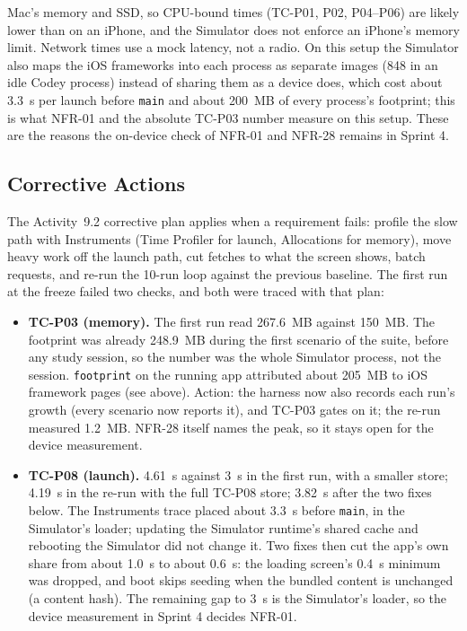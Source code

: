 \documentclass[12pt,letterpaper]{article}
\begin{document}
\begin{itemize}
        Mac's memory and SSD, so CPU-bound times (TC-P01, P02, P04--P06) are likely
        lower than on an iPhone, and the Simulator does not enforce an iPhone's memory
        limit. Network times use a mock latency, not a radio. On this setup the
        Simulator also maps the iOS frameworks into each process as separate images
        (848 in an idle Codey process) instead of sharing them as a device does,
        which cost about 3.3~s per launch before \texttt{main} and about 200~MB of
        every process's footprint; this is what NFR-01 and the absolute TC-P03
        number measure on this setup. These are the reasons the on-device check of
        NFR-01 and NFR-28 remains in Sprint 4.
\end{itemize}

\subsection{Corrective Actions}
The Activity~9.2 corrective plan applies when a requirement fails: profile the slow
path with Instruments (Time Profiler for launch, Allocations for memory), move heavy
work off the launch path, cut fetches to what the screen shows, batch requests, and
re-run the 10-run loop against the previous baseline. The first run at the freeze
failed two checks, and both were traced with that plan:
\begin{itemize}
  \item \textbf{TC-P03 (memory).} The first run read 267.6~MB against 150~MB. The
        footprint was already 248.9~MB during the first scenario of the suite, before
        any study session, so the number was the whole Simulator process, not the
        session. \texttt{footprint} on the running app attributed about 205~MB to iOS
        framework pages (see above). Action: the harness now also records each run's
        growth (every scenario now reports it), and TC-P03 gates on it; the re-run
        measured 1.2~MB. NFR-28 itself names the peak, so it stays open for the
        device measurement.
  \item \textbf{TC-P08 (launch).} 4.61~s against 3~s in the first run, with a smaller
        store; 4.19~s in the re-run with the full TC-P08 store; 3.82~s after the two
        fixes below. The Instruments trace placed
        about 3.3~s before \texttt{main}, in the Simulator's loader; updating the
        Simulator runtime's shared cache and rebooting the Simulator did not change
        it. Two fixes then cut the app's own share from about 1.0~s to about 0.6~s:
        the loading screen's 0.4~s minimum was dropped, and boot skips seeding when
        the bundled content is unchanged (a content hash). The remaining gap to 3~s
        is the Simulator's loader, so the device measurement in Sprint 4 decides
        NFR-01.
\end{itemize}
\end{document}
